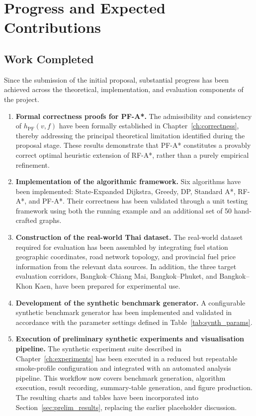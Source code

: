 \chapter{Progress and Expected Contributions}

\section{Work Completed}

Since the submission of the initial proposal, substantial progress has been achieved across the theoretical, implementation, and evaluation components of the project.

\begin{enumerate}
    \item \textbf{Formal correctness proofs for PF-A*.}
          The admissibility and consistency of $h_{\mathrm{PF}}(v,f)$ have been formally established in Chapter~\ref{ch:correctness}, thereby addressing the principal theoretical limitation identified during the proposal stage.
          These results demonstrate that PF-A* constitutes a provably correct optimal heuristic extension of RF-A*, rather than a purely empirical refinement.

    \item \textbf{Implementation of the algorithmic framework.}
          Six algorithms have been implemented: State-Expanded Dijkstra, Greedy, DP, Standard A*, RF-A*, and PF-A*.
          Their correctness has been validated through a unit testing framework using both the running example and an additional set of 50 hand-crafted graphs.

    \item \textbf{Construction of the real-world Thai dataset.}
          The real-world dataset required for evaluation has been assembled by integrating fuel station geographic coordinates, road network topology, and provincial fuel price information from the relevant data sources.
          In addition, the three target evaluation corridors, Bangkok--Chiang Mai, Bangkok--Phuket, and Bangkok--Khon Kaen, have been prepared for experimental use.

    \item \textbf{Development of the synthetic benchmark generator.}
          A configurable synthetic benchmark generator has been implemented and validated in accordance with the parameter settings defined in Table~\ref{tab:synth_params}.

    \item \textbf{Execution of preliminary synthetic experiments and visualisation pipeline.}
          The synthetic experiment suite described in Chapter~\ref{ch:experiments} has been executed in a reduced but repeatable smoke-profile configuration and integrated with an automated analysis pipeline.
          This workflow now covers benchmark generation, algorithm execution, result recording, summary-table generation, and figure production.
          The resulting charts and tables have been incorporated into Section~\ref{sec:prelim_results}, replacing the earlier placeholder discussion.
\end{enumerate}

